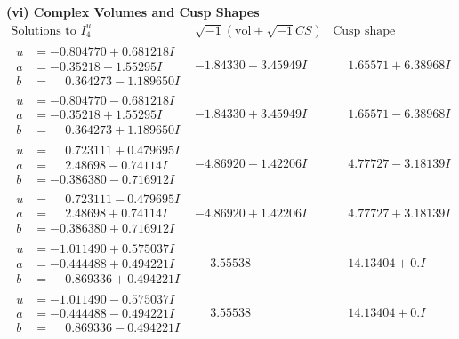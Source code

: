 \documentclass[1p]{elsarticle_modified}
\theoremstyle{definition}
\newcommand{\I}{\sqrt{-1}}
\begin{document}
\newpage\flushleft \textbf{(vi) Complex Volumes and Cusp Shapes}
$$\begin{array}{c|c|c}  
\text{Solutions to }I^u_{4}& \I (\text{vol} + \sqrt{-1}CS) & \text{Cusp shape}\\
 \hline 
\begin{aligned}
u &= -0.804770 + 0.681218 I \\
a &= -0.35218 - 1.55295 I \\
b &= \phantom{-}0.364273 - 1.189650 I\end{aligned}
 & -1.84330 - 3.45949 I & \phantom{-}1.65571 + 6.38968 I \\ \hline\begin{aligned}
u &= -0.804770 - 0.681218 I \\
a &= -0.35218 + 1.55295 I \\
b &= \phantom{-}0.364273 + 1.189650 I\end{aligned}
 & -1.84330 + 3.45949 I & \phantom{-}1.65571 - 6.38968 I \\ \hline\begin{aligned}
u &= \phantom{-}0.723111 + 0.479695 I \\
a &= \phantom{-}2.48698 - 0.74114 I \\
b &= -0.386380 - 0.716912 I\end{aligned}
 & -4.86920 - 1.42206 I & \phantom{-}4.77727 - 3.18139 I \\ \hline\begin{aligned}
u &= \phantom{-}0.723111 - 0.479695 I \\
a &= \phantom{-}2.48698 + 0.74114 I \\
b &= -0.386380 + 0.716912 I\end{aligned}
 & -4.86920 + 1.42206 I & \phantom{-}4.77727 + 3.18139 I \\ \hline\begin{aligned}
u &= -1.011490 + 0.575037 I \\
a &= -0.444488 + 0.494221 I \\
b &= \phantom{-}0.869336 + 0.494221 I\end{aligned}
 & \phantom{-}3.55538\phantom{ +0.000000I} & \phantom{-}14.13404 + 0. I\phantom{ +0.000000I} \\ \hline\begin{aligned}
u &= -1.011490 - 0.575037 I \\
a &= -0.444488 - 0.494221 I \\
b &= \phantom{-}0.869336 - 0.494221 I\end{aligned}
 & \phantom{-}3.55538\phantom{ +0.000000I} & \phantom{-}14.13404 + 0. I\phantom{ +0.000000I} \\ \hline\begin{aligned}

\end{aligned}
\end{array}$$
\end{document}

